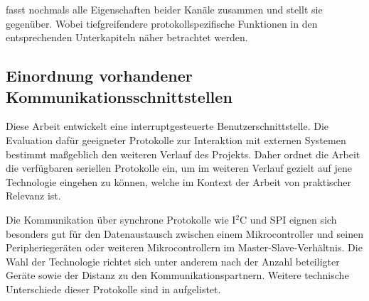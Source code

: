  fasst nochmals alle Eigenschaften beider Kan\"ale zusammen und stellt sie gegen\"uber. Wobei tiefgreifendere protokollspezifische Funktionen in den entsprechenden Unterkapiteln n\"aher betrachtet werden.

\subsection{Einordnung vorhandener Kommunikationsschnittstellen}
\label{sec:Einordnung_Schnittstellen}

Diese Arbeit entwickelt eine interruptgesteuerte Benutzerschnittstelle. Die Evaluation daf\"ur geeigneter Protokolle zur Interaktion mit externen  Systemen bestimmt ma{\ss}geblich den weiteren Verlauf des Projekts. Daher ordnet die Arbeit die verf\"ugbaren seriellen Protokolle ein, um im weiteren Verlauf gezielt auf jene Technologie eingehen zu k\"onnen, welche im Kontext der Arbeit von praktischer Relevanz ist.

\newpage
Die Kommunikation \"uber synchrone Protokolle wie I$^{2}$C und SPI eignen sich besonders gut f\"ur den Datenaustausch zwischen einem Mikrocontroller und seinen Peripherieger\"aten oder weiteren Mikrocontrollern im Master-Slave-Verh\"altnis. Die Wahl der Technologie richtet sich unter anderem nach der Anzahl beteiligter Ger\"ate sowie der Distanz zu den Kommunikationspartnern. Weitere technische Unterschiede dieser Protokolle sind in  aufgelistet.


